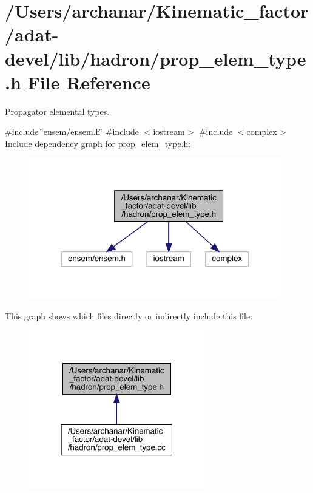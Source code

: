 \hypertarget{adat-devel_2lib_2hadron_2prop__elem__type_8h}{}\section{/\+Users/archanar/\+Kinematic\+\_\+factor/adat-\/devel/lib/hadron/prop\+\_\+elem\+\_\+type.h File Reference}
\label{adat-devel_2lib_2hadron_2prop__elem__type_8h}


Propagator elemental types.  


{\ttfamily \#include \char`\"{}ensem/ensem.\+h\char`\"{}}\newline
{\ttfamily \#include $<$iostream$>$}\newline
{\ttfamily \#include $<$complex$>$}\newline
Include dependency graph for prop\+\_\+elem\+\_\+type.\+h\+:
\nopagebreak
\begin{figure}[H]
\begin{center}
\leavevmode
\includegraphics[width=311pt]{da/d64/adat-devel_2lib_2hadron_2prop__elem__type_8h__incl}
\end{center}
\end{figure}
This graph shows which files directly or indirectly include this file\+:
\nopagebreak
\begin{figure}[H]
\begin{center}
\leavevmode
\includegraphics[width=217pt]{dc/dc8/adat-devel_2lib_2hadron_2prop__elem__type_8h__dep__incl}
\end{center}
\end{figure}
